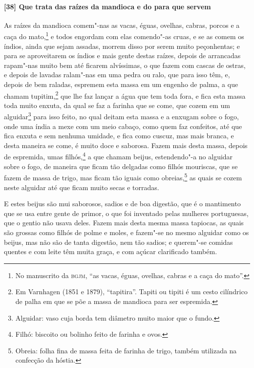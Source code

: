 \begin{linenumbers}
\paragraph{[38] Que trata das raízes da mandioca e do para que servem}\quad
As raízes da mandioca comem"-nas as vacas, éguas, ovelhas, cabras, porcos e a caça do
mato,\footnote{ No manuscrito da \textsc{bgjm}, ``as vacas, éguas, ovelhas, cabras e a
caça do mato''.} e todos engordam com elas comendo"-as cruas, e se as comem os índios,
ainda que sejam assadas, morrem disso por serem muito peçonhentas; e para se aproveitarem
os índios e mais gente destas raízes, depois de arrancadas rapam"-nas muito bem até ficarem
alvíssimas, o que fazem com cascas de ostras, e depois de lavadas ralam"-nas em uma pedra
ou ralo, que para isso têm, e, depois de bem raladas, espremem esta massa em um engenho de
palma, a que chamam tupitim,\footnote{ Em Varnhagen (1851 e 1879), ``tapitira''. Tapiti ou
tipiti é um cesto cilíndrico de palha em que se põe a massa de mandioca para ser
espremida.} que lhe faz lançar a água que tem toda fora, e fica esta massa toda muito
enxuta, da qual se faz a farinha que se come, que cozem em um alguidar\footnote{ Alguidar:
vaso cuja borda tem diâmetro muito maior que o fundo.} para isso feito, no qual deitam
esta massa e a enxugam sobre o fogo, onde uma índia a mexe com um meio cabaço, como quem
faz confeitos, até que fica enxuta e sem nenhuma umidade, e fica como cuscuz, mas mais
branca, e desta maneira se come, é muito doce e saborosa. Fazem mais desta massa, depois
de espremida, umas filhós,\footnote{ Filhó: biscoito ou bolinho feito de farinha e ovos.}
a que chamam beijus, estendendo"-a no alguidar sobre o fogo, de maneira que ficam tão
delgadas como filhós mouriscas, que se fazem de massa de trigo, mas ficam tão iguais como
obreias,\footnote{ Obreia: folha fina de massa feita de farinha de trigo, também utilizada
na confecção da hóstia.} as quais se cozem neste alguidar até que ficam muito secas e
torradas.

E estes beijus são mui saborosos, sadios e de boa digestão, que é o mantimento que se usa
entre gente de primor, o que foi inventado pelas mulheres portuguesas, que o gentio não
usava deles. Fazem mais desta mesma massa tapiocas, as quais são grossas como filhós de
polme e moles, e fazem"-se no mesmo alguidar como os beijus, mas não são de tanta digestão,
nem tão sadios; e querem"-se comidas quentes e com leite têm muita graça, e com açúcar
clarificado também.


\end{linenumbers}
